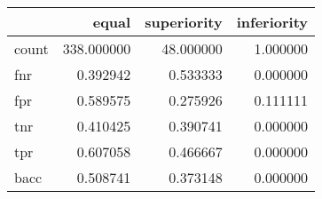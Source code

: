 \begin{tabular}{lrrr}
\toprule
{} &       equal &  superiority &  inferiority \\
\midrule
count &  338.000000 &    48.000000 &     1.000000 \\
fnr   &    0.392942 &     0.533333 &     0.000000 \\
fpr   &    0.589575 &     0.275926 &     0.111111 \\
tnr   &    0.410425 &     0.390741 &     0.000000 \\
tpr   &    0.607058 &     0.466667 &     0.000000 \\
bacc  &    0.508741 &     0.373148 &     0.000000 \\
\bottomrule
\end{tabular}
